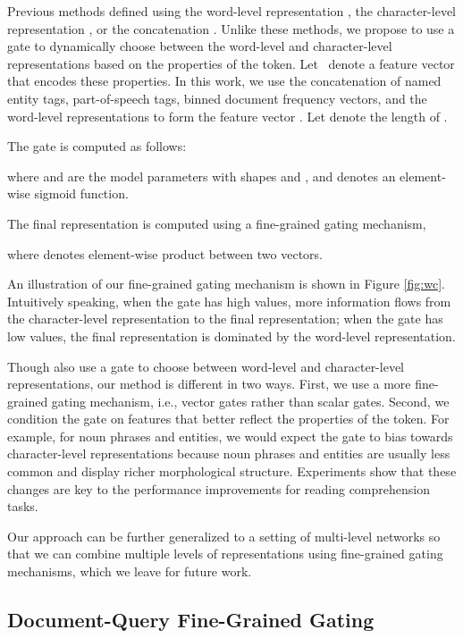 \documentclass{article} \usepackage{iclr2017_conference,times}
\begin{document}
Previous methods defined  using the word-level representation  \citep{collobert2011natural}, the character-level representation  \citep{ling2015finding}, or the concatenation  \citep{yang2016multi}. Unlike these methods, we propose to use a gate to dynamically choose between the word-level and character-level representations based on the properties of the token. Let~ denote a feature vector that encodes these properties. In this work, we use the concatenation of named entity tags, part-of-speech tags, binned document frequency vectors, and the word-level representations to form the feature vector . Let  denote the length of .

The gate is computed as follows:

where  and  are the model parameters with shapes  and , and  denotes an element-wise sigmoid function.

The final representation is computed using a fine-grained gating mechanism,

where  denotes element-wise product between two vectors.

An illustration of our fine-grained gating mechanism is shown in Figure \ref{fig:wc}. Intuitively speaking, when the gate  has high values, more information flows from the character-level representation to the final representation; when the gate  has low values, the final representation is dominated by the word-level representation.

Though \cite{miyamoto2016gated} also use a gate to choose between word-level and character-level representations, our method is different in two ways. First, we use a more fine-grained gating mechanism, i.e., vector gates rather than scalar gates. Second, we condition the gate on features that better reflect the properties of the token. For example, for noun phrases and entities, we would expect the gate to bias towards character-level representations because noun phrases and entities are usually less common and display richer morphological structure. Experiments show that these changes are key to the performance improvements for reading comprehension tasks.

Our approach can be further generalized to a setting of multi-level networks so that we can combine multiple levels of representations using fine-grained gating mechanisms, which we leave for future work.

\subsection{Document-Query Fine-Grained Gating} \label{sec:pq}
\end{document}
